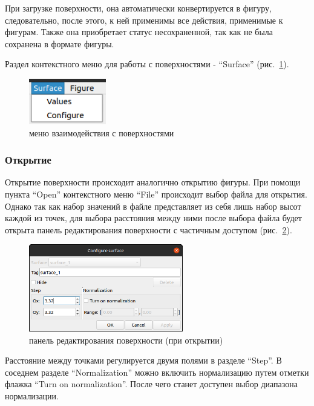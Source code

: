 \documentclass[12pt, a4paper, hidelinks]{article}
\begin{document}
При загрузке поверхности, она автоматически конвертируется в фигуру, следовательно, после этого, к ней применимы все действия, применимые к фигурам. Также она приобретает статус несохраненной, так как не была сохранена в формате фигуры.

Раздел контекстного меню для работы с поверхностями - \enquote{Surface} (рис.~\ref{surface_menu}).
\begin{figure}[htbp!]
	\centering
	\includegraphics[width=0.3\textwidth]{images/surfacemenu.png}
	\caption{меню взаимодействия с поверхностями}
	\label{surface_menu}
\end{figure}

\subsubsection{Открытие}
Открытие поверхности происходит аналогично открытию фигуры. При помощи пункта \enquote{Open} контекстного меню \enquote{File} происходит выбор файла для открытия. Однако так как набор значений в файле представляет из себя лишь набор высот каждой из точек, для выбора расстояния между ними после выбора файла будет открыта панель редактирования поверхности с частичным доступом (рис.~\ref{surface_cfg_open}).
\begin{figure}[htbp!]
	\centering
	\includegraphics[width=0.6\textwidth]{images/surfacecfgopening.png}
	\caption{панель редактирования поверхности (при открытии)}
	\label{surface_cfg_open}
\end{figure}

Расстояние между точками регулируется двумя полями в разделе \enquote{Step}. В соседнем разделе \enquote{Normalization} можно включить нормализацию путем отметки флажка \enquote{Turn on normalization}. После чего станет доступен выбор диапазона нормализации.
\end{document}
